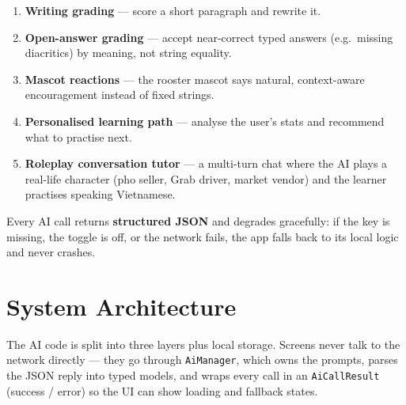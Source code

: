 \documentclass[11pt,a4paper]{article}
\begin{document}
\begin{enumerate}[leftmargin=1.4cm]
  \item \textbf{Writing grading} --- score a short paragraph and rewrite it.
  \item \textbf{Open-answer grading} --- accept near-correct typed answers
        (e.g.\ missing diacritics) by meaning, not string equality.
  \item \textbf{Mascot reactions} --- the rooster mascot says natural,
        context-aware encouragement instead of fixed strings.
  \item \textbf{Personalised learning path} --- analyse the user's stats and
        recommend what to practise next.
  \item \textbf{Roleplay conversation tutor} --- a multi-turn chat where the AI
        plays a real-life character (pho seller, Grab driver, market vendor)
        and the learner practises speaking Vietnamese.
\end{enumerate}

Every AI call returns \textbf{structured JSON} and degrades gracefully: if the
key is missing, the toggle is off, or the network fails, the app falls back to
its local logic and never crashes.

\section{System Architecture}

The AI code is split into three layers plus local storage. Screens never talk
to the network directly --- they go through \texttt{AiManager}, which owns the
prompts, parses the JSON reply into typed models, and wraps every call in an
\texttt{AiCallResult} (success / error) so the UI can show loading and fallback
states.
\end{document}
